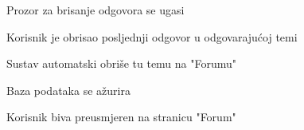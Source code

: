 \begin{packed_item}
\begin{packed_item}
\begin{packed_enum}
								\item Prozor za brisanje odgovora se ugasi
								
							\end{packed_enum}
						\item[4.b] Korisnik je obrisao posljednji odgovor u odgovarajućoj temi
							\item[] \begin{packed_enum}
								
								\item Sustav automatski obriše tu temu na "Forumu"
								\item Baza podataka se ažurira
								\item Korisnik biva preusmjeren na stranicu "Forum"
								
							\end{packed_enum}
						\end{packed_item}
						
						
					\end{packed_item}
					
